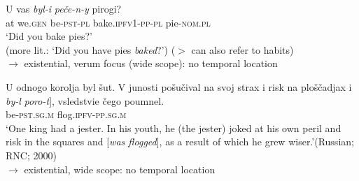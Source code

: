 \documentclass[output=paper]{langscibook}
\begin{document}
\ex\label{wiem:ex:pirogi} {\gll
{U} {vas} \textit{{byl-i}} \textit{{peče-n-y}} {pirogi}?\\
at we.\textsc{gen} be-\textsc{pst-pl} bake.\textsc{ipfv1-pp-pl} pie-\textsc{nom.pl}\\
\glt ‘Did you bake pies?'\\
(more lit.: `Did you have pies \textit{baked}?') ($>$ can also refer to habits) \\
$\rightarrow$ existential, verum focus (wide scope): no temporal location 
}


\ex\label{wiem:ex:korol}
{U} {odnogo} {korolja} {byl} {šut}. {V} {junosti} {pošučival} {na} {svoj} {strax} {i} {risk} {na} {ploščadjax} {i}\\
{\gll \minsp{[} \textit{{by-l}} \textit{{poro-t}}], {vsledstvie} {čego} {poumnel}.\\ 
{} be-\textsc{pst.sg.m}	flog.\textsc{ipfv-pp.sg.m} {}\\
\glt 
‘One king had a jester. In his youth, he (the jester) joked at his own peril and risk in the squares and [\textit{was flogged}], as a result of which he grew wiser.’\hfill (Russian; RNC; 2000)\\$\rightarrow$ existential, wide scope: no temporal location
}
\z
\end{document}
